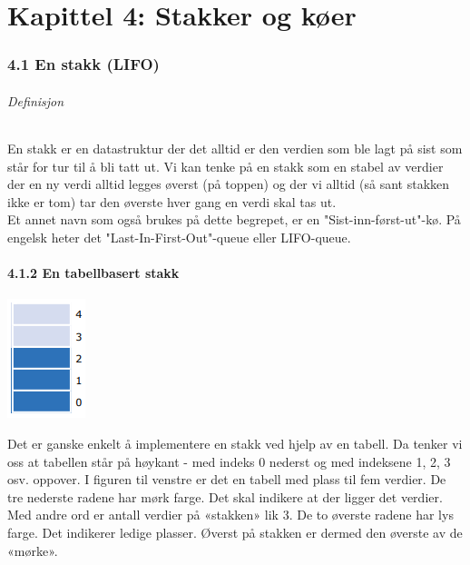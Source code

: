 \documentclass[11pt]{article}
\begin{document}
\newpage
\part{Kapittel 4: Stakker og køer}

\section{4.1 En stakk (LIFO)}
    \paragraph{Definisjon}
        En stakk er en datastruktur der det alltid er den verdien som ble lagt
        på sist som står for tur til å bli tatt ut. Vi kan tenke på en stakk som en stabel av
        verdier der en ny verdi alltid legges øverst (på toppen) og der vi alltid (så sant
        stakken ikke er tom) tar den øverste hver gang en verdi skal tas ut.\\

        Et annet navn som også brukes på dette begrepet, er en "Sist-inn-først-ut"-kø. På engelsk
        heter det "Last-In-First-Out"-queue eller LIFO-queue.

    \subsection{4.1.2 En tabellbasert stakk}

        \begin{multicols}{2}
            \includegraphics[center]{4.1.2-1.png}

                \columnbreak

            Det er ganske enkelt å implementere en stakk ved hjelp av en tabell. Da
            tenker vi oss at tabellen står på høykant - med indeks 0 nederst og med
            indeksene 1, 2, 3 osv. oppover. I figuren til venstre er det en tabell med plass
            til fem verdier. De tre nederste radene har mørk farge. Det skal indikere at der
            ligger det verdier. Med andre ord er antall verdier på «stakken» lik 3. De to
            øverste radene har lys farge. Det indikerer ledige plasser. Øverst på stakken er
            dermed den øverste av de «mørke». 
        \end{multicols}
\end{document}
